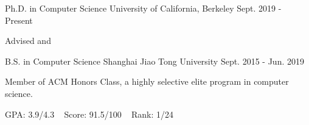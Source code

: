 
\begin{cventries}

  \cventry
	{Ph.D. in Computer Science} %
	{University of California, Berkeley} %
	{Sept. 2019 - Present} %
	{} %
	{
		\begin{cvitems} %
			\item {Advised  and }
		\end{cvitems}
	}

  \cventry
    {B.S. in Computer Science} %
    {Shanghai Jiao Tong University} %
    {Sept. 2015 - Jun. 2019} %
    {} %
    {
    \begin{cvitems} %
    	\item {Member of ACM Honors Class, a highly selective elite program in computer science.}
    	\item {GPA: 3.9/4.3 ~ Score: 91.5/100 ~ Rank: 1/24}
    \end{cvitems}
    }

\end{cventries}